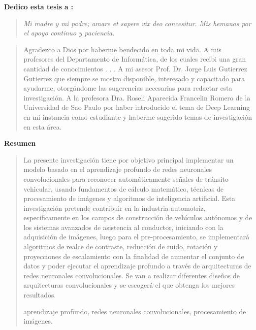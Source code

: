  
 {\bf\Large {Dedico esta tesis a :}}
 \vskip 1cm
  \begin{quotation}
  {\it Mi madre y mi padre; amare et sapere vix deo concesitur.
    \vskip 1cm
    Mis hemanas por el apoyo continuo y paciencia.
  }
 \end{quotation}


  \newpage
  {\bf\Large {}}
  \vskip 1.5cm
  \begin{quotation}
  Agradezco a Dios por haberme bendecido en toda mi vida.
  \vskip 1cm
  A mis profesores del Departamento de Informática, de los cuales recibi una gran cantidad de conocimientos  . . .
  \vskip 1cm
  A mi asesor Prof. Dr. Jorge Luis Gutierrez Gutierrez que siempre se mostro disponible, interesado y capacitado para ayudarme, otorgándome las sugerencias necesarias para redactar esta investigación.
  \vskip 1cm
  A la profesora Dra. Roseli Aparecida Francelin Romero de la Universidad de Sao Paulo por haber introducido el tema de Deep Learning en mi instancia como estudiante y haberme sugerido temas de investigación en esta área.

  \vskip 1cm
  \end{quotation}


  \newpage
  \begin{center}
   {\bf\LARGE Resumen}
  \end{center} 
  \vskip 0.5cm
  \begin{quotation}
  
  La presente investigación tiene por objetivo principal implementar un modelo basado en el aprendizaje profundo de redes neuronales convolucionales para reconocer automáticamente señales de tránsito vehicular, usando fundamentos de cálculo matemático, técnicas de procesamiento de imágenes y algoritmos de inteligencia artificial.
  \vskip 0.2cm
  Esta investigación pretende contribuir en la industria automotriz, especificamente en los campos de construcción de vehículos autónomos y de los sistemas avanzados de asistencia al conductor, iniciando con la adquisición de imágenes, luego para el pre-procesamiento, se implementará algoritmos de realce de contraste, reducción de ruido, rotación y proyecciones de escalamiento con la finalidad de aumentar el conjunto de datos y poder ejecutar el aprendizaje profundo a través de arquitecturas de redes neuronales convolucionales. Se van a realizar diferentes diseños de arquitecturas convolucionales y se escogerá el que obtenga los mejores resultados.


  \vskip 0.3cm
  \hspace*{-0.6cm}{\bf Palabras claves:} aprendizaje profundo, redes neuronales convolucionales, procesamiento de imágenes.
  \end{quotation}



